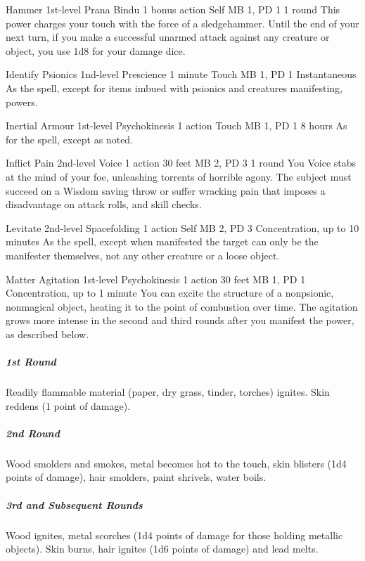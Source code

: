 \DndPowerHeader%
  {Hammer}
  {1st-level Prana Bindu}
  {1 bonus action}
  {Self}
  {MB 1, PD 1}
  {1 round}
This power charges your touch with the force of a sledgehammer.
Until the end of your next turn,
if you make a successful unarmed attack against any creature or object,
you use 1d8 for your damage dice.

\DndPowerHeader%
  {Identify Psionics}
  {1nd-level Prescience}
  {1 minute}
  {Touch}
  {MB 1, PD 1}
  {Instantaneous}
As the  spell,
except for items imbued with psionics
and creatures manifesting, powers.

\DndPowerHeader%
  {Inertial Armour}
  {1st-level Psychokinesis}
  {1 action}
  {Touch}
  {MB 1, PD 1}
  {8 hours}
As for the  spell, except as noted.

\DndPowerHeader%
  {Inflict Pain}
  {2nd-level Voice}
  {1 action}
  {30 feet}
  {MB 2, PD 3}
  {1 round}
  You Voice stabs at the mind of your foe,
  unleashing torrents of horrible agony.
  The subject must succeed on a Wisdom saving throw or
  suffer wracking pain that imposes a disadvantage on attack rolls,
  and skill checks.

\DndPowerHeader%
  {Levitate}
  {2nd-level Spacefolding}
  {1 action}
  {Self}
  {MB 2, PD 3}
  {Concentration, up to 10 minutes}
As the  spell,
except when manifested the target can only be the manifester themselves,
not any other creature or a loose object.

\DndPowerHeader%
  {Matter Agitation}
  {1st-level Psychokinesis}
  {1 action}
  {30 feet}
  {MB 1, PD 1}
  {Concentration, up to 1 minute}
  You can excite the structure of a nonpsionic,
  nonmagical object,
  heating it to the point of combustion over time.
  The agitation grows more intense in the second and third rounds
  after you manifest the power, as described below.

  \subparagraph{1st Round}
    Readily flammable material
    (paper, dry grass, tinder, torches) ignites.
    Skin reddens (1 point of damage).
  \subparagraph{2nd Round}
    Wood smolders and smokes,
    metal becomes hot to the touch,
    skin blisters (1d4 points of damage),
    hair smolders, paint shrivels, water boils.
  \subparagraph{3rd and Subsequent Rounds}
    Wood ignites, metal scorches
    (1d4 points of damage for those holding metallic objects).
    Skin burns, hair ignites (1d6 points of damage) and lead melts.

